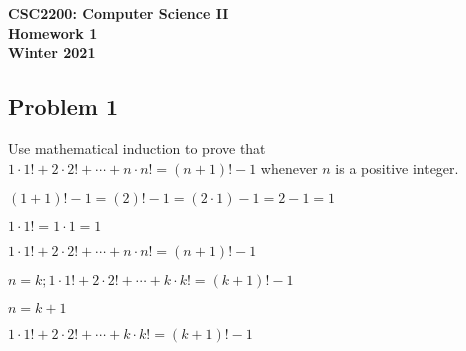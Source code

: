 \documentclass[11pt]{article}
\date{}
\begin{document}
\thispagestyle{empty}


{\LARGE
\begin{center}
{\bf \textsf{CSC2200: Computer Science II \\
	Homework 1\\
	Winter 2021\\}}
\end{center}
}

\vspace*{0.9cm}




\subsection*{{\bf \textsf{Problem 1}}}
Use mathematical induction to prove that $1\cdot 1! + 2\cdot 2! + \cdots + n\cdot n! = (n+1)!-1$
whenever $n$ is a positive integer.

\vspace*{0.2cm}


\noindent $(1 + 1)! - 1 = (2)! - 1 = (2 \cdot 1) - 1 = 2 - 1 = 1$

\noindent $1 \cdot 1! = 1 \cdot 1 = 1$

\begin{comment}
\noindent $(2 + 1)! - 1 = (3)! - 1 = (3\cdot 2\cdot 1) - 1 = 6 - 1 = 5$

\noindent $2 \cdot 2! = 2\cdot (2\cdot 1) = 5$
\end{comment}

\noindent $1\cdot 1! + 2\cdot 2! + \cdots + n\cdot n! = (n+1)! - 1$

\noindent $n=k; 1\cdot 1! + 2\cdot 2! + \cdots + k\cdot k! = (k+1)! - 1$

\noindent $n = k + 1$

\noindent $1\cdot 1! + 2\cdot 2! + \cdots + k\cdot k! = (k + 1)! - 1$
\begin{comment}
\noindent $1\cdot 1! + 2\cdot 2! + \cdots + k\cdot k! + (k + 1)\cdot (k + 1)! = (k + 1)! - 1 + (k + 1)\cdot (k + 1)!$

\noindent $1\cdot 1! + 2\cdot 2! + \cdots + k\cdot k! + (k + 1)\cdot (k + 1)!=(k+1)! - 1 + (k+1)\cdot (k+1)!$


\noindent $1\cdot 1! + 2\cdot 2! + \cdots + k\cdot k! + (k + 1)\cdot (k + 1)!=(k+1)! - 1 + (k+2-1)\cdot (k+1)!$

\noindent $1\cdot 1! + 2\cdot 2! + \cdots + k\cdot k! + (k + 1)\cdot (k + 1)!=(k+1)! - 1 + (k+2)! - (k+1)!$

\noindent $1\cdot 1! + 2\cdot 2! + \cdots + k\cdot k! + (k + 1)\cdot (k + 1)!=(k+2)! - 1$
\end{comment}
\end{document}

